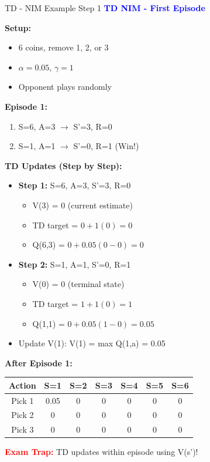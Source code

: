 \documentclass[8pt]{beamer}
\begin{document}
\begin{frame}{TD - NIM Example Step 1}
\fontsize{6.5}{7.5}\selectfont
\textcolor{blue}{\textbf{TD NIM - First Episode}}

\textbf{Setup:}
\begin{itemize}
\item 6 coins, remove 1, 2, or 3
\item $\alpha = 0.05$, $\gamma = 1$
\item Opponent plays randomly
\end{itemize}

\textbf{Episode 1:}
\begin{enumerate}
\item S=6, A=3 $\rightarrow$ S'=3, R=0
\item S=1, A=1 $\rightarrow$ S'=0, R=1 (Win!)
\end{enumerate}

\textbf{TD Updates (Step by Step):}
\begin{itemize}
\item \textbf{Step 1:} S=6, A=3, S'=3, R=0
\begin{itemize}
\item V(3) = 0 (current estimate)
\item TD target = $0 + 1(0) = 0$
\item Q(6,3) = $0 + 0.05(0 - 0) = 0$
\end{itemize}
\item \textbf{Step 2:} S=1, A=1, S'=0, R=1
\begin{itemize}
\item V(0) = 0 (terminal state)
\item TD target = $1 + 1(0) = 1$
\item Q(1,1) = $0 + 0.05(1 - 0) = 0.05$
\end{itemize}
\item Update V(1): V(1) = max Q(1,a) = 0.05
\end{itemize}

\textbf{After Episode 1:}
\begin{tabular}{|c|c|c|c|c|c|c|}
\hline
Action & S=1 & S=2 & S=3 & S=4 & S=5 & S=6 \\
\hline
Pick 1 & 0.05 & 0 & 0 & 0 & 0 & 0 \\
\hline
Pick 2 & 0 & 0 & 0 & 0 & 0 & 0 \\
\hline
Pick 3 & 0 & 0 & 0 & 0 & 0 & 0 \\
\hline
\end{tabular}

\textcolor{red}{\textbf{Exam Trap:}} TD updates within episode using V(s')!
\end{frame}
\end{document}
